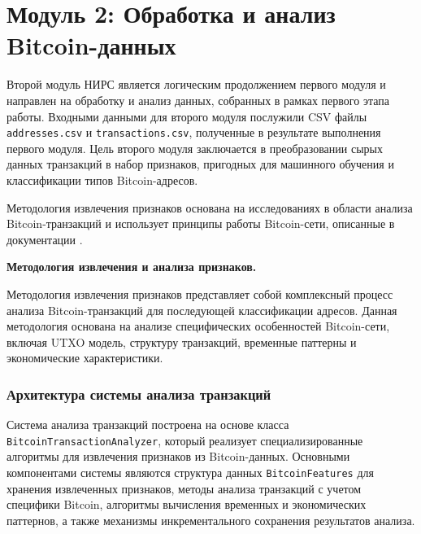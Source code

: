 \section{Модуль 2: Обработка и анализ Bitcoin-данных}

Второй модуль НИРС является логическим продолжением первого модуля и направлен на обработку и анализ данных, собранных в рамках первого этапа работы. Входными данными для второго модуля послужили CSV файлы \texttt{addresses.csv} и \texttt{transactions.csv}, полученные в результате выполнения первого модуля. Цель второго модуля заключается в преобразовании сырых данных транзакций в набор признаков, пригодных для машинного обучения и классификации типов Bitcoin-адресов.

Методология извлечения признаков основана на исследованиях в области анализа Bitcoin-транзакций \cite{elliptic_dataset}\cite{bitcoin_heist_dataset}\cite{real_cats_dataset}\cite{babd_dataset} и использует принципы работы Bitcoin-сети, описанные в документации \cite{bitcoin_core_documentation}.

\textbf{Методология извлечения и анализа признаков.}

Методология извлечения признаков представляет собой комплексный процесс анализа Bitcoin-транзакций для последующей классификации адресов. Данная методология основана на анализе специфических особенностей Bitcoin-сети, включая UTXO модель, структуру транзакций, временные паттерны и экономические характеристики.

\subsubsection{Архитектура системы анализа транзакций}

Система анализа транзакций построена на основе класса \texttt{BitcoinTransactionAnalyzer}, который реализует специализированные алгоритмы для извлечения признаков из Bitcoin-данных. Основными компонентами системы являются структура данных \texttt{BitcoinFeatures} для хранения извлеченных признаков, методы анализа транзакций с учетом специфики Bitcoin, алгоритмы вычисления временных и экономических паттернов, а также механизмы инкрементального сохранения результатов анализа.

